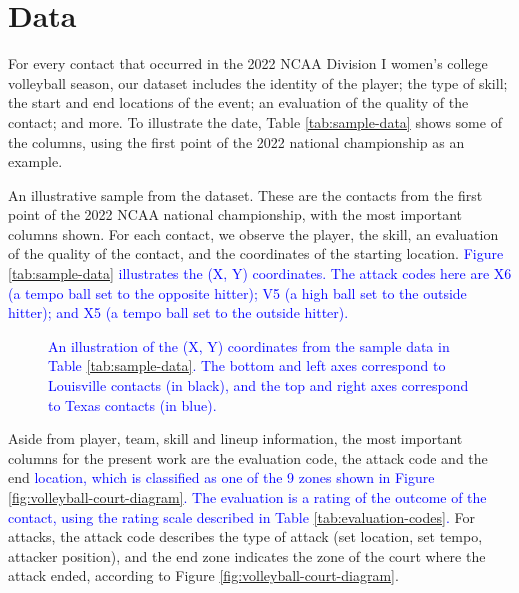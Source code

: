\documentclass[USenglish]{article}
\theoremstyle{dgthm}
\theoremstyle{dgdef}
\begin{document}
\section{Data}
\label{sec:data}

For every contact that occurred in the 2022 NCAA Division I women's college volleyball season, our dataset includes the identity of the player; the type of skill; the start and end locations of the event; an evaluation of the quality of the contact; and more.  To illustrate the date, Table \ref{tab:sample-data} shows some of the columns, using the first point of the 2022 national championship as an example.

\begin{table}
    \centering
    
    \caption{An illustrative sample from the dataset. These are the contacts from the first point of the 2022 NCAA national championship, with the most important columns shown. For each contact, we observe the player, the skill, an evaluation of the quality of the contact, and the coordinates of the starting location. \textcolor{blue}{Figure \ref{tab:sample-data} illustrates the (X, Y) coordinates. The attack codes here are X6 (a tempo ball set to the opposite hitter); V5 (a high ball set to the outside hitter); and X5 (a tempo ball set to the outside hitter).}}
    \label{tab:sample-data}
\end{table}

\begin{figure}
    \centering
    \caption{\textcolor{blue}{An illustration of the (X, Y) coordinates from the sample data in Table \ref{tab:sample-data}. The bottom and left axes correspond to Louisville contacts (in black), and the top and right axes correspond to Texas contacts (in blue).}}
    \label{fig:sample-data}
\end{figure}

Aside from player, team, skill and lineup information, the most important columns for the present work are the evaluation code, the attack code and the end \textcolor{blue}{location, which is classified as one of the 9 zones shown in Figure \ref{fig:volleyball-court-diagram}. The evaluation is a rating of the outcome of the contact, using the rating scale described in Table \ref{tab:evaluation-codes}.} For attacks, the attack code describes the type of attack (set location, set tempo, attacker position), and the end zone indicates the zone of the court where the attack ended, according to Figure \ref{fig:volleyball-court-diagram}.
\end{document}
